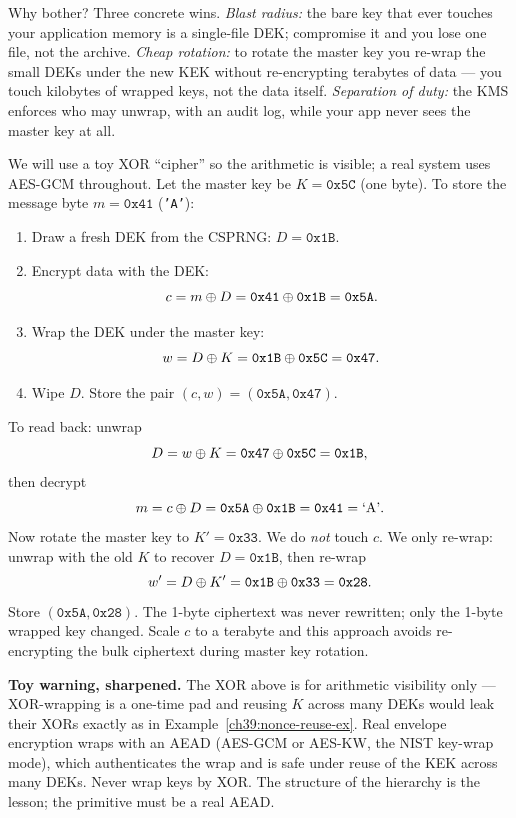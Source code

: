 Why bother? Three concrete wins. \emph{Blast radius:} the bare key that ever
touches your application memory is a single-file DEK; compromise it and you lose one
file, not the archive. \emph{Cheap rotation:} to rotate the master key you re-wrap
the small DEKs under the new KEK without re-encrypting terabytes of data ---
you touch kilobytes of wrapped keys, not the data itself. \emph{Separation of duty:}
the KMS enforces who may unwrap, with an audit log, while your app never sees the
master key at all.

\begin{example}
\label{ch39:envelope-ex}
We will use a toy XOR ``cipher'' so the arithmetic is visible; a real system uses
AES-GCM throughout. Let the master key be $K = \texttt{0x5C}$ (one byte). To store
the message byte $m = \texttt{0x41}$ (\texttt{'A'}):
\begin{enumerate}
  \item Draw a fresh DEK from the CSPRNG: $D = \texttt{0x1B}$.
  \item Encrypt data with the DEK: 
        \[ c = m \oplus D = \texttt{0x41} \oplus \texttt{0x1B} = \texttt{0x5A} . \]
  \item Wrap the DEK under the master key: 
        \[ w = D \oplus K = \texttt{0x1B} \oplus \texttt{0x5C} = \texttt{0x47} . \]
  \item Wipe $D$. Store the pair $(c, w) = (\texttt{0x5A}, \texttt{0x47})$.
\end{enumerate}
To read back: unwrap 
\[ D = w \oplus K = \texttt{0x47} \oplus \texttt{0x5C} = \texttt{0x1B} , \]
then decrypt 
\[ m = c \oplus D = \texttt{0x5A} \oplus \texttt{0x1B} = \texttt{0x41} = \text{`A'} . \]
Now rotate the master key to $K' = \texttt{0x33}$. We
do \emph{not} touch $c$. We only re-wrap: unwrap with the old $K$ to recover
$D = \texttt{0x1B}$, then re-wrap 
\[ w' = D \oplus K' = \texttt{0x1B} \oplus \texttt{0x33} = \texttt{0x28} . \]
Store $(\texttt{0x5A}, \texttt{0x28})$. The 1-byte ciphertext was
never rewritten; only the 1-byte wrapped key changed. Scale $c$ to a terabyte and
this approach avoids re-encrypting the bulk ciphertext during master key rotation.
\end{example}

\begin{focusbox}
\textbf{Toy warning, sharpened.} The XOR above is for arithmetic visibility only ---
XOR-wrapping is a one-time pad and reusing $K$ across many DEKs would leak their
XORs exactly as in Example~\ref{ch39:nonce-reuse-ex}. Real envelope encryption
wraps with an AEAD (AES-GCM or AES-KW, the NIST key-wrap mode), which authenticates
the wrap and is safe under reuse of the KEK across many DEKs. Never wrap keys by
XOR. The structure of the hierarchy is the lesson; the primitive must be a real
AEAD.
\end{focusbox}


